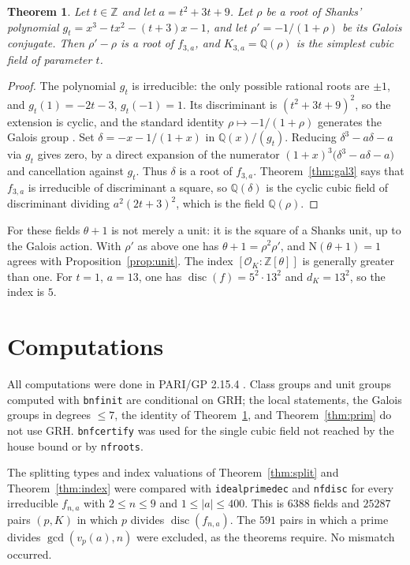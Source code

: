 \documentclass[11pt]{article}
\newtheorem{theorem}{Theorem}
\theoremstyle{definition}
\theoremstyle{remark}
\newcommand{\Z}{\mathbb{Z}}
\newcommand{\Q}{\mathbb{Q}}
\newcommand{\OK}{\mathcal{O}_K}
\newcommand{\disc}{\operatorname{disc}}
\newcommand{\Norm}{\mathrm{N}}
\begin{document}
\begin{theorem}\label{thm:shanks}
Let $t\in\Z$ and let $a=t^{2}+3t+9$. Let $\rho$ be a root of Shanks' polynomial
$g_t=x^{3}-tx^{2}-(t+3)x-1$, and let $\rho'=-1/(1+\rho)$ be its Galois conjugate.
Then $\rho'-\rho$ is a root of $f_{3,a}$, and $K_{3,a}=\Q(\rho)$ is the simplest
cubic field of parameter $t$.
\end{theorem}

\begin{proof}
The polynomial $g_t$ is irreducible: the only possible rational roots are
$\pm 1$, and $g_t(1)=-2t-3$, $g_t(-1)=1$. Its discriminant is $(t^{2}+3t+9)^{2}$,
so the extension is cyclic, and the standard identity
$\rho\mapsto -1/(1+\rho)$ generates the Galois group \cite{Shanks}. Set
$\delta=-x-1/(1+x)$ in $\Q(x)/(g_t)$. Reducing $\delta^{3}-a\delta-a$ via $g_t$
gives zero, by a direct expansion of the numerator
$(1+x)^{3}\bigl(\delta^{3}-a\delta-a\bigr)$ and cancellation against $g_t$. Thus
$\delta$ is a root of $f_{3,a}$. Theorem~\ref{thm:gal3} says that $f_{3,a}$ is
irreducible of discriminant a square, so $\Q(\delta)$ is the cyclic cubic field
of discriminant dividing $a^{2}(2t+3)^{2}$, which is the field $\Q(\rho)$.
\end{proof}

For these fields $\theta+1$ is not merely a unit: it is the square of a Shanks
unit, up to the Galois action. With $\rho'$ as above one has
$\theta+1=\rho^{2}\rho'$, and $\Norm(\theta+1)=1$ agrees with
Proposition~\ref{prop:unit}. The index $[\OK:\Z[\theta]]$ is generally greater than
one. For $t=1$, $a=13$, one has $\disc(f)=5^{2}\cdot 13^{2}$ and $d_K=13^{2}$, so
the index is $5$.

\section{Computations}\label{sec:num}

All computations were done in PARI/GP 2.15.4 \cite{PARI}. Class groups and unit
groups computed with \texttt{bnfinit} are conditional on GRH; the local
statements, the Galois groups in degrees $\le 7$, the identity of
Theorem~\ref{thm:shanks}, and Theorem~\ref{thm:prim} do not use GRH.
\texttt{bnfcertify} was used for the single cubic field not reached by the
house bound or by \texttt{nfroots}.

The splitting types and index valuations of Theorem~\ref{thm:split} and
Theorem~\ref{thm:index} were compared with \texttt{idealprimedec} and
\texttt{nfdisc} for every irreducible $f_{n,a}$ with $2\le n\le 9$ and
$1\le|a|\le 400$. This is $6388$ fields and $25287$ pairs $(p,K)$ in which $p$
divides $\disc(f_{n,a})$. The $591$ pairs in which a prime divides $\gcd(v_p(a),n)$
were excluded, as the theorems require. No mismatch occurred.
\end{document}
